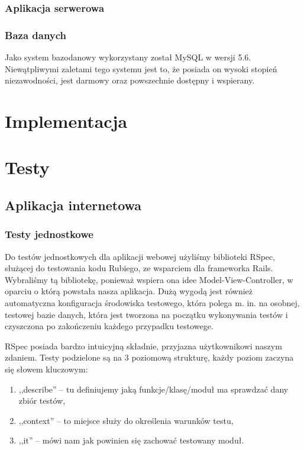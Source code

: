 \documentclass[eng,oneside]{mgr}
\begin{document}
\subsection{Aplikacja serwerowa} %
\label{sub:aplikacja_serwerowa}


\subsection{Baza danych}
Jako system bazodanowy wykorzystany został MySQL w wersji 5.6. Niewątpliwymi zaletami tego systemu jest to, że posiada on wysoki stopień niezawodności, jest darmowy oraz powszechnie dostępny i wspierany.

\chapter{Implementacja}
\chapter{Testy}
\section{Aplikacja internetowa}
\subsection{Testy jednostkowe}
Do testów jednostkowych dla aplikacji webowej użyliśmy biblioteki RSpec, służącej do testowania kodu Rubiego, ze wsparciem dla frameworka Rails. Wybraliśmy tą bibliotekę, ponieważ wspiera ona idee Model-View-Controller, w oparciu o którą powstała nasza aplikacja. Dużą wygodą jest również automatyczna konfiguracja środowiska testowego, która polega m. in.  na osobnej, testowej bazie danych, która jest tworzona na początku wykonywania testów i czyszczona po zakończeniu każdego przypadku testowege.

RSpec posiada bardzo intuicyjną składnie, przyjazna użytkownikowi naszym zdaniem. Testy podzielone są na 3 poziomową strukturę, każdy poziom zaczyna się słowem kluczowym:
\begin{enumerate}
	\item ,,describe'' – tu definiujemy jaką funkcje/klasę/moduł ma sprawdzać dany zbiór testów,
	\item ,,context'' – to miejsce służy do określenia warunków testu,
	\item ,,it'' – mówi nam jak powinien się zachować testowany moduł.
\end{enumerate}
\end{document}
